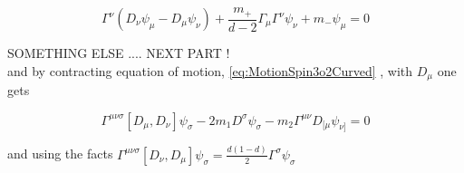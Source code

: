 \begin{equation}
   \Gamma^{\nu}(D_{\nu}\psi_{\mu} - D_{\mu}\psi_{\nu}) + \frac{m_{+}}{d-2}\Gamma_{\mu}\Gamma^{\nu}\psi_{\nu} + m_{-}\psi_{\mu} = 0
\end{equation}


SOMETHING ELSE .... NEXT PART ! \\

and by contracting equation of motion, \ref{eq:MotionSpin3o2Curved} , with $D_{\mu}$ one gets

\begin{equation}
   \Gamma^{\mu\nu\sigma} [D_{\mu},D_{\nu}] \psi_{\sigma} - 2m_1 D^{\sigma} \psi_{\sigma} - m_2 \Gamma^{\mu\nu} D_{[\mu}\psi_{\nu]} = 0 
\end{equation}

and using the facts $\Gamma^{\mu\nu\sigma}[D_{\nu},D_{\mu}]\psi_{\sigma} = \frac{d(1-d)}{2}\Gamma^{\sigma}\psi_{\sigma}$
 

